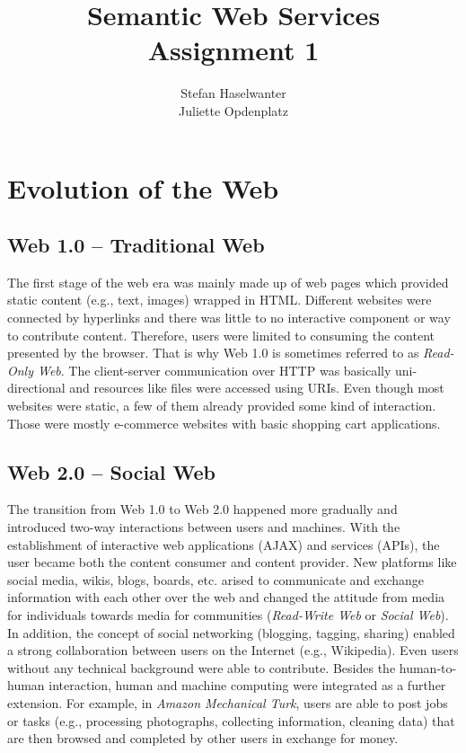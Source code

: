 \documentclass[a4paper]{article}
\title{\textbf{Semantic Web Services}\\\large{Assignment 1}}
\author{Stefan Haselwanter\\Juliette Opdenplatz}
\begin{document}
\maketitle


\section{Evolution of the Web}

\subsection*{Web 1.0 -- Traditional Web}
The first stage of the web era was mainly made up of web pages which provided static content (e.g., text, images) wrapped in HTML.
Different websites were connected by hyperlinks and there was little to no interactive component or way to contribute content.
Therefore, users were limited to consuming the content presented by the browser.
That is why Web 1.0 is sometimes referred to as \emph{Read-Only Web}.
The client-server communication over HTTP was basically uni-directional and resources like files were accessed using URIs.
Even though most websites were static, a few of them already provided some kind of interaction.
Those were mostly e-commerce websites with basic shopping cart applications.

\subsection*{Web 2.0 -- Social Web}
The transition from Web 1.0 to Web 2.0 happened more gradually and introduced two-way interactions between users and machines.
With the establishment of interactive web applications (AJAX) and services (APIs), the user became both the content consumer and content provider.
New platforms like social media, wikis, blogs, boards, etc. arised to communicate and exchange information with each other over the web and changed the attitude from media for individuals towards media for communities (\emph{Read-Write Web} or \emph{Social Web}).
In addition, the concept of social networking (blogging, tagging, sharing) enabled a strong collaboration between users on the Internet (e.g., Wikipedia).
Even users without any technical background were able to contribute.
Besides the human-to-human interaction, human and machine computing were integrated as a further extension.
For example, in \emph{Amazon Mechanical Turk}, users are able to post jobs or tasks (e.g., processing photographs, collecting information, cleaning data) that are then browsed and completed by other users in exchange for money.
\end{document}
